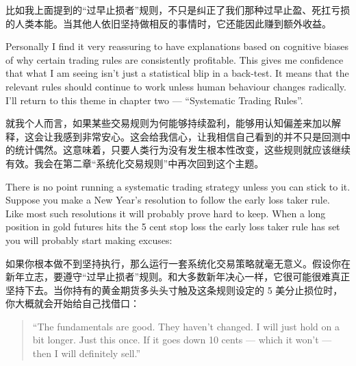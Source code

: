 \begin{chineseblock}比如我上面提到的“过早止损者”规则，不只是纠正了我们那种过早止盈、死扛亏损的人类本能。当其他人依旧坚持做相反的事情时，它还能因此赚到额外收益。\end{chineseblock}

\bipairgap

\begin{englishblock} Personally I find it very reassuring to have explanations based on cognitive biases of why certain trading rules are consistently profitable. This gives me confidence that what I am seeing isn't just a statistical blip in a back-test. It means that the relevant rules should continue to work unless human behaviour changes radically. I'll return to this theme in chapter two --- ``Systematic Trading Rules''. \end{englishblock}

\begin{chineseblock}就我个人而言，如果某些交易规则为何能够持续盈利，能够用认知偏差来加以解释，这会让我感到非常安心。这会给我信心，让我相信自己看到的并不只是回测中的统计偶然。这意味着，只要人类行为没有发生根本性改变，这些规则就应该继续有效。我会在第二章“系统化交易规则”中再次回到这个主题。\end{chineseblock}


\begin{englishblock} There is no point running a systematic trading strategy unless you can stick to it. Suppose you make a New Year's resolution to follow the early loss taker rule. Like most such resolutions it will probably prove hard to keep. When a long position in gold futures hits the 5 cent stop loss the early loss taker rule has set you will probably start making excuses: \end{englishblock}

\begin{chineseblock}如果你根本做不到坚持执行，那么运行一套系统化交易策略就毫无意义。假设你在新年立志，要遵守“过早止损者”规则。和大多数新年决心一样，它很可能很难真正坚持下去。当你持有的黄金期货多头头寸触及这条规则设定的 5 美分止损位时，你大概就会开始给自己找借口：\end{chineseblock}

\begin{quote}
\begingroup\color{\englishbodycolorname} ``The fundamentals are good. They haven't changed. I will just hold on a bit longer. Just this once. If it goes down 10 cents --- which it won't --- then I will definitely sell.'' \endgroup
\end{quote}

